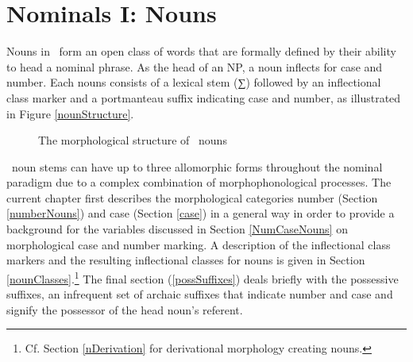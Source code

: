 


\chapter{Nominals I: Nouns}\label{nouns}
Nouns in \PS\ form an open class of words that are formally defined %
by their ability to head a nominal phrase. As the head of an NP, a noun inflects for case and number. 
Each nouns consists of a lexical stem (∑) followed by an inflectional class marker and a portmanteau suffix indicating case and number, as illustrated in Figure \vref{nounStructure}.
\begin{figure}\centering
{}
\caption{The morphological structure of \PS\ nouns}\label{nounStructure}
\end{figure}

\PS\ noun stems can have up to three allomorphic forms throughout the nominal paradigm due to a complex combination of morphophonological processes. 
The current chapter first describes the morphological categories number (Section \ref{numberNouns}) and case (Section \ref{case}) in a general way in order to provide a background for the variables discussed in Section \ref{NumCaseNouns} on morphological case and number marking. %
A description of the inflectional class markers and the resulting inflectional classes for nouns is given in Section \ref{nounClasses}.\footnote{Cf. Section \ref{nDerivation} for derivational morphology creating nouns.} %
The final section (\ref{possSuffixes}) deals briefly with the possessive suffixes, an infrequent set of archaic suffixes that indicate number and case and signify the possessor of the head noun’s referent. %

